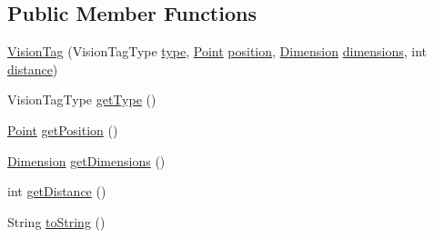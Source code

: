 \subsection*{Public Member Functions}
\begin{DoxyCompactItemize}
\item 
\hyperlink{classworkspace_1_1_a_r_drone_nav_data_1_1src_1_1controller_1_1_vision_tag_ad9df023ce72137df621f37680f5f3585}{Vision\+Tag} (Vision\+Tag\+Type \hyperlink{classworkspace_1_1_a_r_drone_nav_data_1_1src_1_1controller_1_1_vision_tag_ae12a8ea0f00181dc4a32ba896e8966b8}{type}, \hyperlink{classworkspace_1_1_a_r_drone_nav_data_1_1src_1_1controller_1_1_point}{Point} \hyperlink{classworkspace_1_1_a_r_drone_nav_data_1_1src_1_1controller_1_1_vision_tag_a686c10334c973d285ec00b7f3282807a}{position}, \hyperlink{classworkspace_1_1_a_r_drone_nav_data_1_1src_1_1controller_1_1_dimension}{Dimension} \hyperlink{classworkspace_1_1_a_r_drone_nav_data_1_1src_1_1controller_1_1_vision_tag_a01330a161224d9cefa7598f66a682ee5}{dimensions}, int \hyperlink{classworkspace_1_1_a_r_drone_nav_data_1_1src_1_1controller_1_1_vision_tag_a63eb0f5f6caa5bb491fa86a55e50a5e9}{distance})
\item 
Vision\+Tag\+Type \hyperlink{classworkspace_1_1_a_r_drone_nav_data_1_1src_1_1controller_1_1_vision_tag_a9674e4b7f9b9aa58869db05084f4adae}{get\+Type} ()
\item 
\hyperlink{classworkspace_1_1_a_r_drone_nav_data_1_1src_1_1controller_1_1_point}{Point} \hyperlink{classworkspace_1_1_a_r_drone_nav_data_1_1src_1_1controller_1_1_vision_tag_a789060e43bc6b4acfdb3e2c1df0d9b17}{get\+Position} ()
\item 
\hyperlink{classworkspace_1_1_a_r_drone_nav_data_1_1src_1_1controller_1_1_dimension}{Dimension} \hyperlink{classworkspace_1_1_a_r_drone_nav_data_1_1src_1_1controller_1_1_vision_tag_a2595b21759b356e08f3946cbca3a3e46}{get\+Dimensions} ()
\item 
int \hyperlink{classworkspace_1_1_a_r_drone_nav_data_1_1src_1_1controller_1_1_vision_tag_add6d00dd4a086a6a7dafca8826fddc13}{get\+Distance} ()
\item 
String \hyperlink{classworkspace_1_1_a_r_drone_nav_data_1_1src_1_1controller_1_1_vision_tag_a555f66fb5a53659b532974451325ff43}{to\+String} ()
\end{DoxyCompactItemize}
